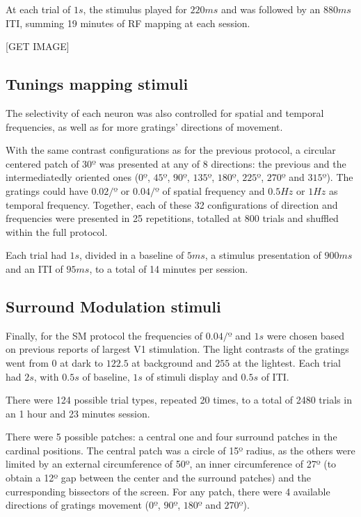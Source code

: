 At each trial of $1 s$, the stimulus played for $220 ms$ and was followed by an $880ms$ ITI, summing 19 minutes of RF mapping at each session. 

[GET IMAGE]

\subsection{Tunings mapping stimuli}
\label{subsec:subbsectionC}

The selectivity of each neuron was also controlled for spatial and temporal frequencies, as well as for more gratings' directions of movement. 

With the same contrast configurations as for the previous protocol, a circular centered patch of $30º$ was presented at any of 8 directions: the previous and the intermediatedly oriented ones ($0º$, $45º$, $90º$, $135º$, $180º$, $225º$, $270º$ and $315º$). The gratings could have $0.02 /º$ or $0.04 /º$ of spatial frequency and $0.5 Hz$ or $1 Hz$ as temporal frequency. Together, each of these 32 configurations of direction and frequencies were presented in 25 repetitions, totalled at 800 trials and shuffled within the full protocol.

Each trial had $1 s$, divided in a baseline of $5 ms$, a stimulus presentation of $900 ms$ and an ITI of $95 ms$, to a total of 14 minutes per session.

\subsection{Surround Modulation stimuli}
\label{subsec:subcsectionC}

Finally, for the SM protocol the frequencies of $0.04 /º$ and $1 s$ were chosen based on previous reports of largest V1 stimulation. The light contrasts of the gratings went from $0$ at dark to $122.5$ at background and $255$ at the lightest. Each trial had $2 s$, with $0.5 s$ of baseline, $1 s$ of stimuli display and $0.5 s$ of ITI. 

There were 124 possible trial types, repeated 20 times, to a total of 2480 trials in an 1 hour and 23 minutes session.

There were 5 possible patches: a central one and four surround patches in the cardinal positions. The central patch was a circle of 15º radius, as the others were limited by an external circumference of 50º, an inner circumference of 27º (to obtain a 12º gap between the center and the surround patches) and the curresponding bissectors of the screen. For any patch, there were 4 available directions of gratings movement ($0º$, $90º$, $180º$ and $270º$).

